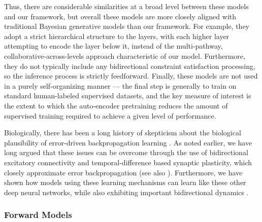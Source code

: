 \documentclass[11pt,twoside]{article}
\newif\myifpdf
\begin{document}
Thus, there are considerable similarities at a broad level between these models and our framework, but overall these models are more closely aligned with traditional Bayesian generative models than our framework.  For example, they adopt a strict hierarchical structure to the layers, with each higher layer attempting to encode the layer below it, instead of the multi-pathway, collaborative-across-levels approach characteristic of our model.  Furthermore, they do not typically include any bidirectional constraint satisfaction processing, so the inference process is strictly feedforward.  Finally, these models are not used in a purely self-organizing manner --- the final step is generally to train on standard human-labeled supervised datasets, and the key measure of interest is the extent to which the auto-encoder pretraining reduces the amount of supervised training required to achieve a given level of performance.

Biologically, there has been a long history of skepticism about the biological plausibility of error-driven backpropagation learning \cite[e.g.,]{Crick89}.  As noted earlier, we have long argued that these issues can be overcome through the use of bidirectional excitatory connectivity and temporal-difference based synaptic plasticity, which closely approximate error backpropagation \cite{OReilly96} (see also ).  Furthermore, we have shown how models using these learning mechanisms can learn like these other deep neural networks, while also exhibiting important bidirectional dynamics \cite{OReillyWyatteHerdEtAl13,WyatteHerdMingusEtAl12,WyatteCurranOReilly12}.  

\subsubsection{Forward Models}
\end{document}
